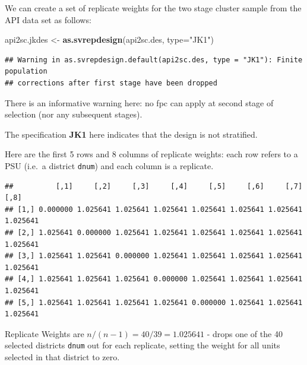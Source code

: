 \documentclass[
]{book}
\newenvironment{Shaded}{\begin{snugshade}}{\end{snugshade}}
\newcommand{\AttributeTok}[1]{\textcolor[rgb]{0.13,0.29,0.53}{#1}}
\newcommand{\DecValTok}[1]{\textcolor[rgb]{0.00,0.00,0.81}{#1}}
\newcommand{\FunctionTok}[1]{\textcolor[rgb]{0.13,0.29,0.53}{\textbf{#1}}}
\newcommand{\NormalTok}[1]{#1}
\newcommand{\OtherTok}[1]{\textcolor[rgb]{0.56,0.35,0.01}{#1}}
\newcommand{\SpecialCharTok}[1]{\textcolor[rgb]{0.81,0.36,0.00}{\textbf{#1}}}
\newcommand{\StringTok}[1]{\textcolor[rgb]{0.31,0.60,0.02}{#1}}
\begin{document}
We can create a set of replicate weights for the two stage cluster sample from the API
data set as follows:

\begin{Shaded}
\begin{Highlighting}[]
\NormalTok{api2sc.jkdes }\OtherTok{\textless{}{-}} \FunctionTok{as.svrepdesign}\NormalTok{(api2sc.des, }\AttributeTok{type=}\StringTok{"JK1"}\NormalTok{)}
\end{Highlighting}
\end{Shaded}

\begin{verbatim}
## Warning in as.svrepdesign.default(api2sc.des, type = "JK1"): Finite population
## corrections after first stage have been dropped
\end{verbatim}

There is an informative warning here: no fpc can apply at second stage of selection
(nor any subsequent stages).

The specification \textbf{JK1} here indicates that the design is not stratified.

Here are the first 5 rows and 8 columns of replicate weights: each row refers to a PSU
(i.e.~a district \texttt{dnum}) and each column is a replicate.

\begin{Shaded}
\end{Shaded}

\begin{verbatim}
##          [,1]     [,2]     [,3]     [,4]     [,5]     [,6]     [,7]     [,8]
## [1,] 0.000000 1.025641 1.025641 1.025641 1.025641 1.025641 1.025641 1.025641
## [2,] 1.025641 0.000000 1.025641 1.025641 1.025641 1.025641 1.025641 1.025641
## [3,] 1.025641 1.025641 0.000000 1.025641 1.025641 1.025641 1.025641 1.025641
## [4,] 1.025641 1.025641 1.025641 0.000000 1.025641 1.025641 1.025641 1.025641
## [5,] 1.025641 1.025641 1.025641 1.025641 0.000000 1.025641 1.025641 1.025641
\end{verbatim}

Replicate Weights are \(n/(n-1)=40/39=1.025641\) - drops one of the 40 selected districts
\texttt{dnum} out for each replicate, setting the weight for all units selected in that district to zero.
\end{document}
